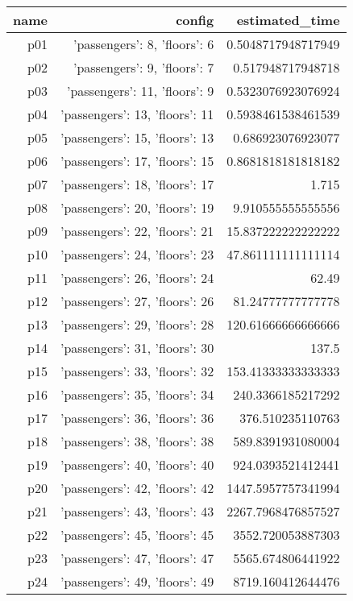 \documentclass{article}
\begin{document}
                            \begin{center}
                            \scriptsize
                            \begin{tabular}{r|r|r}
                            name & config & estimated\_time\\\midrule
                              p01&{'passengers': 8, 'floors': 6}&0.5048717948717949\\
  p02&{'passengers': 9, 'floors': 7}&0.517948717948718\\
  p03&{'passengers': 11, 'floors': 9}&0.5323076923076924\\
  p04&{'passengers': 13, 'floors': 11}&0.5938461538461539\\
  p05&{'passengers': 15, 'floors': 13}&0.686923076923077\\
  p06&{'passengers': 17, 'floors': 15}&0.8681818181818182\\
  p07&{'passengers': 18, 'floors': 17}&1.715\\
  p08&{'passengers': 20, 'floors': 19}&9.910555555555556\\
  p09&{'passengers': 22, 'floors': 21}&15.837222222222222\\
  p10&{'passengers': 24, 'floors': 23}&47.861111111111114\\
  p11&{'passengers': 26, 'floors': 24}&62.49\\
  p12&{'passengers': 27, 'floors': 26}&81.24777777777778\\
  p13&{'passengers': 29, 'floors': 28}&120.61666666666666\\
  p14&{'passengers': 31, 'floors': 30}&137.5\\
  p15&{'passengers': 33, 'floors': 32}&153.41333333333333\\
  p16&{'passengers': 35, 'floors': 34}&240.3366185217292\\
  p17&{'passengers': 36, 'floors': 36}&376.510235110763\\
  p18&{'passengers': 38, 'floors': 38}&589.8391931080004\\
  p19&{'passengers': 40, 'floors': 40}&924.0393521412441\\
  p20&{'passengers': 42, 'floors': 42}&1447.5957757341994\\
  p21&{'passengers': 43, 'floors': 43}&2267.7968476857527\\
  p22&{'passengers': 45, 'floors': 45}&3552.720053887303\\
  p23&{'passengers': 47, 'floors': 47}&5565.674806441922\\
  p24&{'passengers': 49, 'floors': 49}&8719.160412644476\\

\end{tabular}
\end{center}
\end{document}

